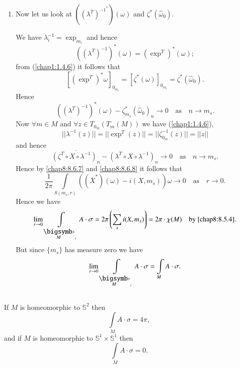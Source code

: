 \begin{enumerate}
\item Now let us look at $((\lambda^{T})^{-1^{\ast}})(\omega)$ and $\zeta^{\ast}(\widehat{\omega}_{0})$.

We have $\lambda^{-1}_{i}=\exp_{m_{i}}$ and hence
$$
((\lambda^{T})^{-1})^{\ast}(\omega)=(\exp^{T})^{\ast}(\omega);
$$
from (\ref{chap1:1.4.6}) it follows that
$$
\left[(\exp^{T})^{\ast}\omega\right]_{0_{m_{i}}}=\left[\zeta^{\ast}(\omega)\right]_{0_{m_{i}}}=\zeta^{\ast}(\widehat{\omega}_{0}).
$$
Hence
$$
((\lambda^{T})^{-1})^{\ast}(\omega)-\zeta^{\ast}_{m_{s}}(\widehat{\omega}_{0})_{n}\to 0\quad\text{as}\quad n\to m_{s}.
$$
Now $\forall m\in M$ and $\forall z\in T_{0_{m}}(T_{m}(M))$ we have (\ref{chap1:1.4.6}),
$$
||\lambda^{-1}(z)||=||\exp^{T}(z)||=||\zeta^{-1}_{0_{m}}(z)||=||z||
$$
and hence
$$
\overline{(\zeta^{T}\circ X\circ \lambda^{-1})_{n}}-(\lambda^{T}\circ X\circ \lambda^{-1})_{n}\to 0\quad\text{as}\quad n\to m_{s}.
$$
Hence by \eqref{chap8:8.6.7} and \eqref{chap8:8.6.8} it follows that
$$
\frac{1}{2\pi}\int\limits_{S(m_{s},r)}((\overline{X}^{\ast})(\omega)-i(X,m_{s}))\omega\to 0\quad\text{as}\quad r\to 0.
$$
Hence \pageoriginale we have
$$
\lim\limits_{r\to 0}\int\limits_{\overdot{M}_{r}}A\cdot \sigma=2\pi\left(\sum_{s}i(X,m_{s})\right)=2\pi\cdot \chi(M)\quad\text{by \eqref{chap8:8.5.4}.}
$$
But since $\{m_{s}\}$ has measure zero we have
$$
\lim\limits_{r\to 0}\int\limits_{\overdot{M}_{r}}A\cdot\sigma=\int\limits_{M}A\cdot \sigma.
$$
\end{enumerate}

\setcounter{subsection}{8}

\subsection{}\label{chap8:8.6.9}

\begin{coro*}
If $M$ is homeomorphic to $\mathbb{S}^{2}$ then
$$
\int\limits_{M}A\cdot \sigma=4\pi,
$$
and if $M$ is homeomorphic to $\mathbb{S}^{1}\times\mathbb{S}^{1}$ then
$$
\int\limits_{M}A\cdot\sigma=0.
$$
\end{coro*}

\subsection{}\label{chap8:8.6.10}


